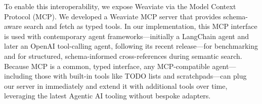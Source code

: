 To enable this interoperability, we expose Weaviate via the Model Context Protocol (MCP). We developed a Weaviate MCP server that provides schema-aware search and fetch as typed tools. In our implementation, this MCP interface is used with contemporary agent frameworks—initially a LangChain agent and later an OpenAI tool-calling agent, following its recent release—for benchmarking and for structured, schema-informed cross-references during semantic search. Because MCP is a common, typed interface, any MCP-compatible agent—including those with built-in tools like TODO lists and scratchpads—can plug our server in immediately and extend it with additional tools over time, leveraging the latest Agentic AI tooling without bespoke adapters.